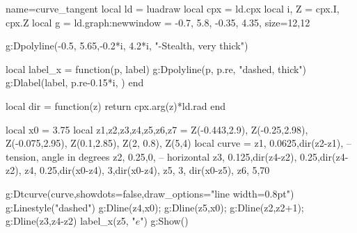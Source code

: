 \documentclass[border=5pt]{standalone}
\begin{document}
\begin{luadraw}{name=curve_tangent}
local ld = luadraw
local cpx = ld.cpx
local i, Z = cpx.I, cpx.Z
local g = ld.graph:new{window = {-0.7, 5.8, -0.35, 4.35}, size={12,12}}

g:Dpolyline({{-0.5, 5.65},{-0.2*i, 4.2*i}}, "-Stealth, very thick")

local label_x = function(p, label)
    g:Dpolyline({p, p.re}, "dashed, thick")
    g:Dlabel(label, p.re-0.15*i, {})
end

local dir = function(z)
    return cpx.arg(z)*ld.rad
end

local x0 = 3.75
local z1,z2,z3,z4,z5,z6,z7 = Z(-0.443,2.9), Z(-0.25,2.98), Z(-0.075,2.95), Z(0.1,2.85), Z(2, 0.8), Z(5,4)
local curve = {
z1, {0.0625,dir(z2-z1)}, -- {tension, angle in degrees}
z2, {0.25,0}, -- horizontal
z3, {0.125,dir(z4-z2), 0.25,dir(z4-z2)},
z4, {0.25,dir(x0-z4), 3,dir(x0-z4)},
z5, {3, dir(x0-z5)},
z6, {5,70}
}

g:Dtcurve(curve,{showdots=false,draw_options="line width=0.8pt"})
g:Linestyle("dashed")
g:Dline(z4,x0); g:Dline(z5,x0); 
g:Dline(z2,z2+1); g:Dline({z3,z4-z2})
label_x(z5, "$e$")
g:Show()
\end{luadraw}
\end{document}

